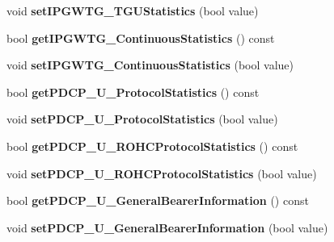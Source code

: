 \begin{DoxyCompactItemize}
\item 
void {\bfseries set\+I\+P\+G\+W\+T\+G\+\_\+\+T\+G\+U\+Statistics} (bool value)\hypertarget{class_statistics_a7409ffc532824a4d26aebc1f3579c0bd}{}\label{class_statistics_a7409ffc532824a4d26aebc1f3579c0bd}

\item 
bool {\bfseries get\+I\+P\+G\+W\+T\+G\+\_\+\+Continuous\+Statistics} () const \hypertarget{class_statistics_a4ee45b95eb035f99d909cd9baffcff02}{}\label{class_statistics_a4ee45b95eb035f99d909cd9baffcff02}

\item 
void {\bfseries set\+I\+P\+G\+W\+T\+G\+\_\+\+Continuous\+Statistics} (bool value)\hypertarget{class_statistics_abd9a08ee9c80967c431571a4f1bfeed0}{}\label{class_statistics_abd9a08ee9c80967c431571a4f1bfeed0}

\item 
bool {\bfseries get\+P\+D\+C\+P\+\_\+\+U\+\_\+\+Protocol\+Statistics} () const \hypertarget{class_statistics_a9cff254989719afd812a4fc554867d68}{}\label{class_statistics_a9cff254989719afd812a4fc554867d68}

\item 
void {\bfseries set\+P\+D\+C\+P\+\_\+\+U\+\_\+\+Protocol\+Statistics} (bool value)\hypertarget{class_statistics_a8ce0d9c83e7af574d7f75eb5132abe41}{}\label{class_statistics_a8ce0d9c83e7af574d7f75eb5132abe41}

\item 
bool {\bfseries get\+P\+D\+C\+P\+\_\+\+U\+\_\+\+R\+O\+H\+C\+Protocol\+Statistics} () const \hypertarget{class_statistics_a9f5818f142c392e99d0bd572e10558e5}{}\label{class_statistics_a9f5818f142c392e99d0bd572e10558e5}

\item 
void {\bfseries set\+P\+D\+C\+P\+\_\+\+U\+\_\+\+R\+O\+H\+C\+Protocol\+Statistics} (bool value)\hypertarget{class_statistics_a84a825afc17fbe77f54b1e3fdd2dca31}{}\label{class_statistics_a84a825afc17fbe77f54b1e3fdd2dca31}

\item 
bool {\bfseries get\+P\+D\+C\+P\+\_\+\+U\+\_\+\+General\+Bearer\+Information} () const \hypertarget{class_statistics_a557423baf15fe8af3701b028c0edf097}{}\label{class_statistics_a557423baf15fe8af3701b028c0edf097}

\item 
void {\bfseries set\+P\+D\+C\+P\+\_\+\+U\+\_\+\+General\+Bearer\+Information} (bool value)\hypertarget{class_statistics_a0300ebf0a0a7072690261ec7b9c7469e}{}\label{class_statistics_a0300ebf0a0a7072690261ec7b9c7469e}


\end{DoxyCompactItemize}
